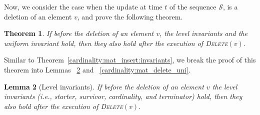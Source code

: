 \documentclass[11pt]{article}
\newtheorem{theorem}{Theorem}
\newtheorem{lemma}[theorem]{Lemma}
\newcommand{\deletev}{{\textsc{Delete}}}
\begin{document}
Now, we consider the case when the update at time $t$ of the sequence $\mathcal{S}$, is a deletion of an element $v$, and prove the following theorem. 

\begin{theorem}
\label{cardinality:mat_delete:invariants}
If before the deletion of an element $v$, the level invariants and the uniform invariant hold, then they also hold after the execution of \deletev$(v)$. 
\end{theorem}

Similar to Theorem~\ref{cardinality:mat_insert:invariants}, we break the proof of this theorem into 
Lemmas ~\ref{cardinality:mat_delete_level} and ~\ref{cardinality:mat_delete_uni}.


\begin{lemma}[Level invariants]
\label{cardinality:mat_delete_level}
If before the deletion of an element $v$ the level invariants (i.e., starter, survivor, cardinality, and terminator) hold, 
then they also hold after the execution of \deletev$(v)$. 
\end{lemma}
\end{document}
